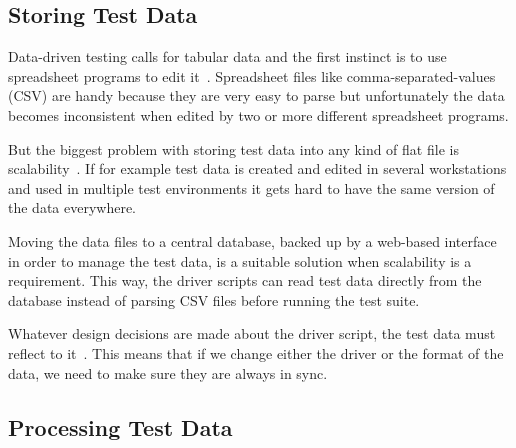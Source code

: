 \subsection{Storing Test Data}

Data-driven testing calls for tabular data and the first instinct is to use
spreadsheet programs to edit it~\cite{Lau07}. Spreadsheet files like
comma-separated-values (CSV) are handy because they are very easy to parse but
unfortunately the data becomes inconsistent when edited by two or more different
spreadsheet programs.

But the biggest problem with storing test data into any kind of flat file is
scalability~\cite{Lau07}. If for example test data is created and edited in
several workstations and used in multiple test environments it gets hard to have
the same version of the data everywhere.

Moving the data files to a central database, backed up by a web-based
interface in order to manage the test data, is a suitable solution when
scalability is a requirement. This way, the driver scripts can read test data
directly from the database instead of parsing CSV files before running the
test suite.

Whatever design decisions are made about the driver script, the test data must
reflect to it~\cite{Fewster99}. This means that if we change either the driver
or the format of the data, we need to make sure they are always in sync.

\subsection{Processing Test Data}

